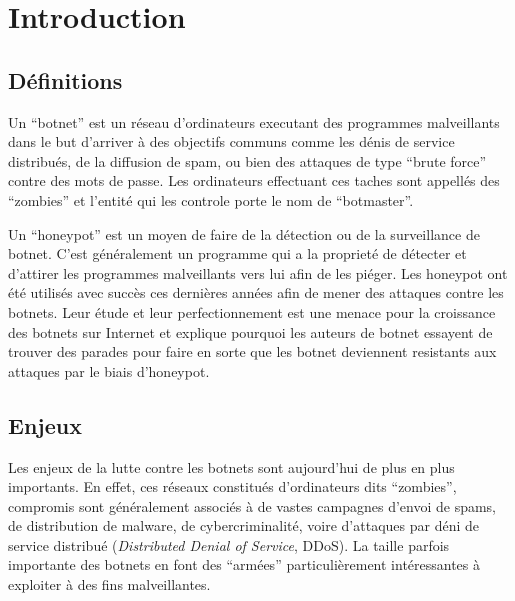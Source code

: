 \section{Introduction}

\subsection{Définitions}

Un ``botnet'' est un réseau d'ordinateurs executant des programmes malveillants
dans le but d'arriver à des objectifs communs comme les dénis de service distribués,
de la diffusion de spam, ou bien des attaques de type ``brute force'' contre
des mots de passe. Les ordinateurs effectuant ces taches sont appellés des ``zombies''
et l'entité qui les controle porte le nom de ``botmaster''.

Un ``honeypot'' est un moyen de faire de la détection ou de la
surveillance de botnet. C'est généralement un programme qui a la proprieté de détecter
et d'attirer les programmes malveillants vers lui afin de les piéger.
Les honeypot ont été utilisés avec succès ces dernières années afin
de mener des attaques contre les botnets. Leur étude et leur perfectionnement
est une menace pour la croissance des botnets sur Internet et explique
pourquoi les auteurs de botnet essayent de trouver des parades pour faire
en sorte que les botnet deviennent resistants aux attaques par le biais d'honeypot.

\subsection{Enjeux}

Les enjeux de la lutte contre les botnets sont aujourd'hui de plus en plus
importants. En effet, ces réseaux constitués d'ordinateurs dits ``zombies'',
compromis sont généralement associés
à de vastes campagnes d'envoi de spams, de distribution de malware, de
cybercriminalité, voire d'attaques par déni de service distribué
(\textit{Distributed Denial of Service}, DDoS).  La taille parfois importante
des botnets en font des ``armées'' particulièrement intéressantes à exploiter à
des fins malveil\-lantes.

